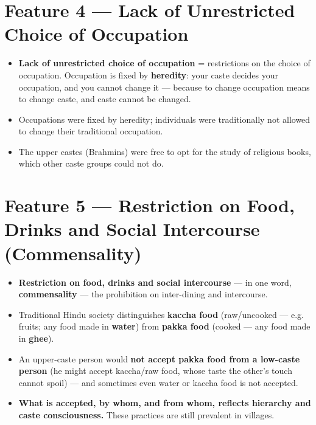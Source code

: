 \section{Feature 4 --- Lack of Unrestricted Choice of Occupation}

\begin{KeyConcept}
\begin{itemize}
\item \textbf{Lack of unrestricted choice of occupation} = restrictions on the choice of occupation. Occupation is fixed by \textbf{heredity}: your caste decides your occupation, and you cannot change it --- because to change occupation means to change caste, and caste cannot be changed.
\item Occupations were fixed by heredity; individuals were traditionally not allowed to change their traditional occupation.
\item The upper castes (Brahmins) were free to opt for the study of religious books, which other caste groups could not do.
\end{itemize}
\end{KeyConcept}

\section{Feature 5 --- Restriction on Food, Drinks and Social Intercourse (Commensality)}

\begin{KeyConcept}
\begin{itemize}
\item \textbf{Restriction on food, drinks and social intercourse} --- in one word, \textbf{commensality} --- the prohibition on inter-dining and intercourse.
\item Traditional Hindu society distinguishes \textbf{kaccha food} (raw/uncooked --- e.g. fruits; any food made in \textbf{water}) from \textbf{pakka food} (cooked --- any food made in \textbf{ghee}).
\item An upper-caste person would \textbf{not accept pakka food from a low-caste person} (he might accept kaccha/raw food, whose taste the other's touch cannot spoil) --- and sometimes even water or kaccha food is not accepted.
\item \textbf{What is accepted, by whom, and from whom, reflects hierarchy and caste consciousness.} These practices are still prevalent in villages.
\end{itemize}
\end{KeyConcept}

